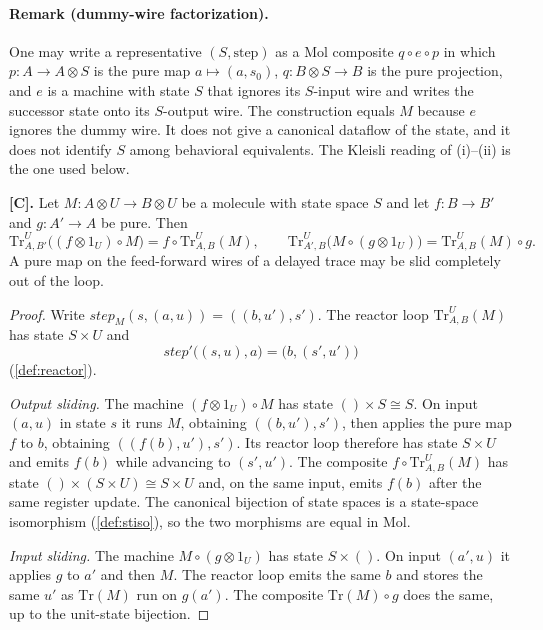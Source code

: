 \paragraph{Remark (dummy-wire factorization).}
One may write a representative $(S, \mathrm{step})$ as a Mol composite
$q \circ e \circ p$ in which $p : A \to A \otimes S$ is the pure map
$a \mapsto (a, s_0)$, $q : B \otimes S \to B$ is the pure projection, and
$e$ is a machine with state $S$ that ignores its $S$-input wire and
writes the successor state onto its $S$-output wire. The construction
equals $M$ because $e$ ignores the dummy wire. It does not give a
canonical dataflow of the state, and it does not identify $S$ among
behavioral equivalents. The Kleisli reading of (i)--(ii) is the one used
below.

\begin{theorem}\label{thm:34}
\textbf{[C].} Let $M : A \otimes U \to B \otimes U$ be a molecule with
state space $S$ and let $f : B \to B'$ and $g : A' \to A$ be pure. Then
\[
\mathrm{Tr}^{U}_{A,B'}\bigl ((f \otimes 1_U) \circ M\bigr)
= f \circ \mathrm{Tr}^{U}_{A,B} (M),
\qquad
\mathrm{Tr}^{U}_{A',B}\bigl (M \circ (g \otimes 1_U)\bigr)
= \mathrm{Tr}^{U}_{A,B} (M) \circ g.
\]
A pure map on the feed-forward wires of a delayed trace may be slid
completely out of the loop.
\end{theorem}

\begin{proof}
Write $\mathit{step}_M (s, (a, u)) = ((b, u'), s')$. The reactor loop
$\mathrm{Tr}^{U}_{A,B} (M)$ has state $S \times U$ and
\[
\mathit{step}'\bigl ((s, u), a\bigr) = \bigl (b, (s', u')\bigr)
\]
(\autoref{def:reactor}).

\emph{Output sliding.} The machine $(f \otimes 1_U) \circ M$ has state
$() \times S \cong S$. On input $(a, u)$ in state $s$ it runs $M$,
obtaining $((b, u'), s')$, then applies the pure map $f$ to $b$,
obtaining $((f (b), u'), s')$. Its reactor loop therefore has state
$S \times U$ and emits $f (b)$ while advancing to $(s', u')$. The
composite $f \circ \mathrm{Tr}^{U}_{A,B} (M)$ has state
$() \times (S \times U) \cong S \times U$ and, on the same input, emits
$f (b)$ after the same register update. The canonical bijection of state
spaces is a state-space isomorphism (\autoref{def:stiso}), so the two
morphisms are equal in Mol.

\emph{Input sliding.} The machine $M \circ (g \otimes 1_U)$ has state
$S \times ()$. On input $(a', u)$ it applies $g$ to $a'$ and then $M$.
The reactor loop emits the same $b$ and stores the same $u'$ as
$\mathrm{Tr} (M)$ run on $g (a')$. The composite
$\mathrm{Tr} (M) \circ g$ does the same, up to the unit-state bijection.
\end{proof}

